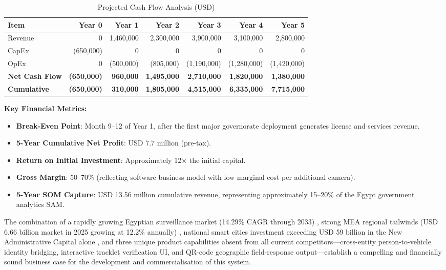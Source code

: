 \begin{table}[htbp]
\centering
\caption{Projected Cash Flow Analysis (USD)}
\label{tab:cash-flow}
\begin{tabular}{|l|r|r|r|r|r|r|}
\hline
\textbf{Item} & \textbf{Year 0} & \textbf{Year 1} & \textbf{Year 2} & \textbf{Year 3} & \textbf{Year 4} & \textbf{Year 5} \\
\hline
Revenue       &           0 & 1,460,000 & 2,300,000 & 3,900,000 & 3,100,000 & 2,800,000 \\
CapEx         &  (650,000)  &         0 &         0 &         0 &         0 &         0 \\
OpEx          &           0 &  (500,000)&  (805,000)&(1,190,000)&(1,280,000)&(1,420,000)\\
\hline
\textbf{Net Cash Flow}   & \textbf{(650,000)} & \textbf{960,000} & \textbf{1,495,000} & \textbf{2,710,000} & \textbf{1,820,000} & \textbf{1,380,000} \\
\textbf{Cumulative}      & \textbf{(650,000)} & \textbf{310,000} & \textbf{1,805,000} & \textbf{4,515,000} & \textbf{6,335,000} & \textbf{7,715,000} \\
\hline
\end{tabular}
\end{table}

\textbf{Key Financial Metrics:}
\begin{itemize}
    \item \textbf{Break-Even Point}: Month 9--12 of Year 1, after the first major governorate deployment generates license and services revenue.
    \item \textbf{5-Year Cumulative Net Profit}: USD 7.7 million (pre-tax).
    \item \textbf{Return on Initial Investment}: Approximately 12$\times$ the initial capital.
    \item \textbf{Gross Margin}: 50--70\% (reflecting software business model with low marginal cost per additional camera).
    \item \textbf{5-Year SOM Capture}: USD 13.56 million cumulative revenue, representing approximately 15--20\% of the Egypt government analytics SAM.
\end{itemize}

The combination of a rapidly growing Egyptian surveillance market (14.29\% CAGR through 2033) \cite{imarc_egypt}, strong MEA regional tailwinds (USD 6.66 billion market in 2025 growing at 12.2\% annually) \cite{grandview_mea}, national smart cities investment exceeding USD 59 billion in the New Administrative Capital alone \cite{egypt_nac_59b}, and three unique product capabilities absent from all current competitors—cross-entity person-to-vehicle identity bridging, interactive tracklet verification UI, and QR-code geographic field-response output—establish a compelling and financially sound business case for the development and commercialisation of this system.
